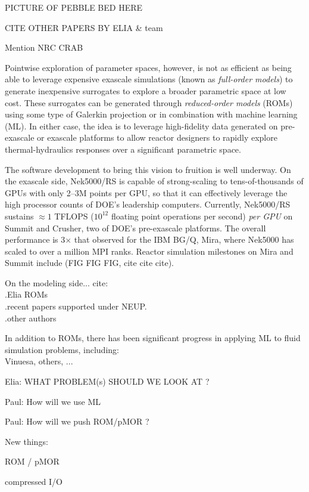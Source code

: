 PICTURE OF PEBBLE BED HERE

CITE OTHER PAPERS BY ELIA \& team

Mention NRC CRAB

Pointwise exploration of parameter spaces, however, is not as efficient as being
able to leverage expensive exascale simulations (known as {\em full-order
models}) to generate inexpensive surrogates to explore a broader parametric
space at low cost.    These surrogates can be generated through {\em reduced-order
models} (ROMs) using some type of Galerkin projection or in combination with
machine learning (ML).   In either case, the idea is to leverage high-fidelity
data generated on pre-exascale or exascale platforms to allow reactor designers
to rapidly explore thermal-hydraulics responses over a significant parametric
space.

The software development to bring this vision to fruition is well underway.
On the exascale side, Nek5000/RS is capable of strong-scaling to tens-of-thousands
of GPUs with only 2--3M points per GPU, so that it can effectively leverage
the high processor counts of DOE's leadership computers.  Currently, Nek5000/RS
sustains $\approx 1$ TFLOPS ($10^{12}$ floating point operations per second)
{\em per GPU} on Summit and Crusher, two of DOE's pre-exascale platforms.
The overall performance is 3$\times$ that observed for the IBM BG/Q, Mira,
where Nek5000 has scaled to over a million MPI ranks.   Reactor simulation
milestones on Mira and Summit include (FIG FIG FIG, cite cite cite).

On the modeling side...  cite: \\
.Elia ROMs \\
.recent papers supported under NEUP. \\
.other authors

In addition to ROMs, there has been significant progress in applying
ML to fluid simulation problems, including: \\
Vinuesa, others, ...


Elia: WHAT PROBLEM(s) SHOULD WE LOOK AT ?

Paul: How will we use ML

Paul: How will we push ROM/pMOR ?









New things:

ROM / pMOR

compressed I/O

















